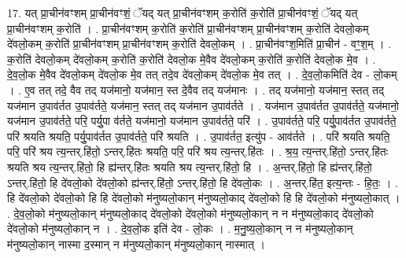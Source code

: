 \documentclass[17pt]{extarticle}
\begin{document}
17. यत् प्रा॒चीन॑वꣳशम् प्रा॒चीन॑वꣳशं॒ ॅयद् यत् प्रा॒चीन॑वꣳशम् क॒रोति॑ क॒रोति॑ प्रा॒चीन॑वꣳशं॒ ॅयद् यत् प्रा॒चीन॑वꣳशम् क॒रोति॑ । . प्रा॒चीन॑वꣳशम् क॒रोति॑ क॒रोति॑ प्रा॒चीन॑वꣳशम् प्रा॒चीन॑वꣳशम् क॒रोति॑ देवलो॒कम् दे॑वलो॒कम् क॒रोति॑ प्रा॒चीन॑वꣳशम् प्रा॒चीन॑वꣳशम् क॒रोति॑ देवलो॒कम् । . प्रा॒चीन॑वꣳश॒मिति॑ प्रा॒चीन॑ - वꣳ॒॒श॒म् । . क॒रोति॑ देवलो॒कम् दे॑वलो॒कम् क॒रोति॑ क॒रोति॑ देवलो॒क मे॒वैव दे॑वलो॒कम् क॒रोति॑ क॒रोति॑ देवलो॒क मे॒व । . दे॒व॒लो॒क मे॒वैव दे॑वलो॒कम् दे॑वलो॒क मे॒व तत् तदे॒व दे॑वलो॒कम् दे॑वलो॒क मे॒व तत् । . दे॒व॒लो॒कमिति॑ देव - लो॒कम् । . ए॒व तत् तदे॒ वैव तद् यज॑मानो॒ यज॑मान॒ स्त दे॒वैव तद् यज॑मानः । . तद् यज॑मानो॒ यज॑मान॒ स्तत् तद् यज॑मान उ॒पाव॑र्तत उ॒पाव॑र्तते॒ यज॑मान॒ स्तत् तद् यज॑मान उ॒पाव॑र्तते । . यज॑मान उ॒पाव॑र्तत उ॒पाव॑र्तते॒ यज॑मानो॒ यज॑मान उ॒पाव॑र्तते॒ परि॒ पर्यु॒पा व॑र्तते॒ यज॑मानो॒ यज॑मान उ॒पाव॑र्तते॒ परि॑ । . उ॒पाव॑र्तते॒ परि॒ पर्यु॒पाव॑र्तत उ॒पाव॑र्तते॒ परि॑ श्रयति श्रयति॒ पर्यु॒पाव॑र्तत उ॒पाव॑र्तते॒ परि॑ श्रयति । . उ॒पाव॑र्तत॒ इत्यु॑प - आव॑र्तते । . परि॑ श्रयति श्रयति॒ परि॒ परि॑ श्रय त्य॒न्तर्.हि॑तो॒ ऽन्तर्.हि॑तः श्रयति॒ परि॒ परि॑ श्रय त्य॒न्तर्.हि॑तः । . श्र॒य॒ त्य॒न्तर्.हि॑तो॒ ऽन्तर्.हि॑तः श्रयति श्रय त्य॒न्तर्.हि॑तो॒ हि ह्य॑न्तर्.हि॑तः श्रयति श्रय त्य॒न्तर्.हि॑तो॒ हि । . अ॒न्तर्.हि॑तो॒ हि ह्य॑न्तर्.हि॑तो॒ ऽन्तर्.हि॑तो॒ हि दे॑वलो॒को दे॑वलो॒को ह्य॑न्तर्.हि॑तो॒ ऽन्तर्.हि॑तो॒ हि दे॑वलो॒कः । . अ॒न्तर्.हि॑त॒ इत्य॒न्तः - हि॒तः॒ । . हि दे॑वलो॒को दे॑वलो॒को हि हि दे॑वलो॒को म॑नुष्यलो॒कान् म॑नुष्यलो॒काद् दे॑वलो॒को हि हि दे॑वलो॒को म॑नुष्यलो॒कात् । . दे॒व॒लो॒को म॑नुष्यलो॒कान् म॑नुष्यलो॒काद् दे॑वलो॒को दे॑वलो॒को म॑नुष्यलो॒कान् न न म॑नुष्यलो॒काद् दे॑वलो॒को दे॑वलो॒को म॑नुष्यलो॒कान् न । . दे॒व॒लो॒क इति॑ देव - लो॒कः । . म॒नु॒ष्य॒लो॒कान् न न म॑नुष्यलो॒कान् म॑नुष्यलो॒कान् नास्मा द॒स्मान् न म॑नुष्यलो॒कान् म॑नुष्यलो॒कान् नास्मात् । \newline
\end{document}
